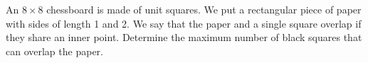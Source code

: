 An $8\times 8$ chessboard is made of unit squares. We put a rectangular piece of paper with sides of length 1 and 2. We say that the paper and a single square overlap if they share an inner point. Determine the maximum number of black squares that can overlap the paper.